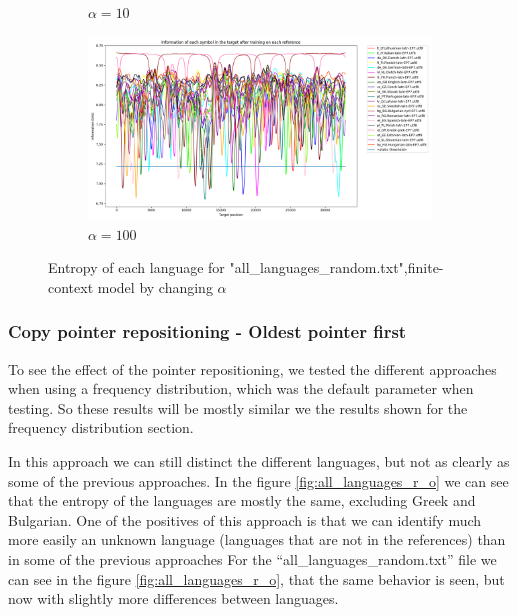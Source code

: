 \documentclass{article}
\begin{document}
\begin{figure}
\begin{subfigure}[b]{0.3\textwidth}
\begin{center}
        \end{center}
        \caption{$\alpha = 10$}
        \label{fig:all_languages_random_p_c:10:3}
    \end{subfigure}
    \hfill
    \begin{subfigure}[b]{0.3\textwidth}
        \begin{center}
            \includegraphics[width=1.0\linewidth]{../results/all_languages_random/-p_c:100:3.png}
        \end{center}
        \caption{$\alpha = 100$}
        \label{fig:all_languages_random_p_c:100:3}
    \end{subfigure}
    
    \caption{Entropy of each language for "all_languages_random.txt",finite-context model by changing $\alpha$}
    \label{fig:all_languages_random_p_c:alpha}
\end{figure}

\subsubsection{Copy pointer repositioning - Oldest pointer first}
\label{subsubsec:results_locate_lang_oldest_pointer_first}

To see the effect of the pointer repositioning, we tested the different approaches when using a frequency distribution, which was the default parameter when testing.
So these results will be mostly similar we the results shown for the frequency distribution section.

In this approach we can still distinct the different languages, but not as clearly as some of the previous approaches.
In the figure \ref{fig:all_languages_r_o} we can see that the entropy of the languages are mostly the same, excluding Greek and Bulgarian.
One of the positives of this approach is that we can identify much more easily an unknown language (languages that are not in the references) than in some of the previous approaches
For the “all_languages_random.txt” file we can see in the figure \ref{fig:all_languages_r_o}, that the same behavior is seen, but now with slightly more differences between languages.
\end{document}
